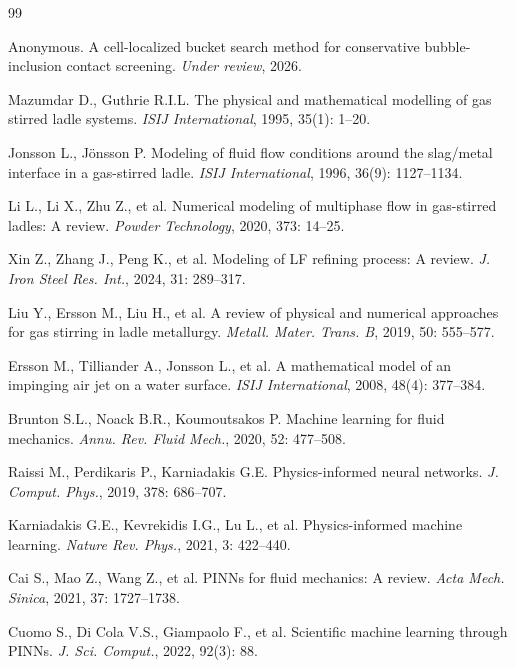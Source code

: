 \documentclass[12pt,a4paper]{article}
\begin{document}

\begin{thebibliography}{99}

 Anonymous. A cell-localized bucket search method for conservative bubble-inclusion contact screening. \textit{Under review}, 2026.

 Mazumdar D., Guthrie R.I.L. The physical and mathematical modelling of gas stirred ladle systems. \textit{ISIJ International}, 1995, 35(1): 1--20.

 Jonsson L., J\"{o}nsson P. Modeling of fluid flow conditions around the slag/metal interface in a gas-stirred ladle. \textit{ISIJ International}, 1996, 36(9): 1127--1134.

 Li L., Li X., Zhu Z., et al. Numerical modeling of multiphase flow in gas-stirred ladles: A review. \textit{Powder Technology}, 2020, 373: 14--25.

 Xin Z., Zhang J., Peng K., et al. Modeling of LF refining process: A review. \textit{J. Iron Steel Res. Int.}, 2024, 31: 289--317.

 Liu Y., Ersson M., Liu H., et al. A review of physical and numerical approaches for gas stirring in ladle metallurgy. \textit{Metall. Mater. Trans. B}, 2019, 50: 555--577.

 Ersson M., Tilliander A., Jonsson L., et al. A mathematical model of an impinging air jet on a water surface. \textit{ISIJ International}, 2008, 48(4): 377--384.

 Brunton S.L., Noack B.R., Koumoutsakos P. Machine learning for fluid mechanics. \textit{Annu. Rev. Fluid Mech.}, 2020, 52: 477--508.

 Raissi M., Perdikaris P., Karniadakis G.E. Physics-informed neural networks. \textit{J. Comput. Phys.}, 2019, 378: 686--707.

 Karniadakis G.E., Kevrekidis I.G., Lu L., et al. Physics-informed machine learning. \textit{Nature Rev. Phys.}, 2021, 3: 422--440.

 Cai S., Mao Z., Wang Z., et al. PINNs for fluid mechanics: A review. \textit{Acta Mech. Sinica}, 2021, 37: 1727--1738.

 Cuomo S., Di Cola V.S., Giampaolo F., et al. Scientific machine learning through PINNs. \textit{J. Sci. Comput.}, 2022, 92(3): 88.


\end{thebibliography}
\end{document}
